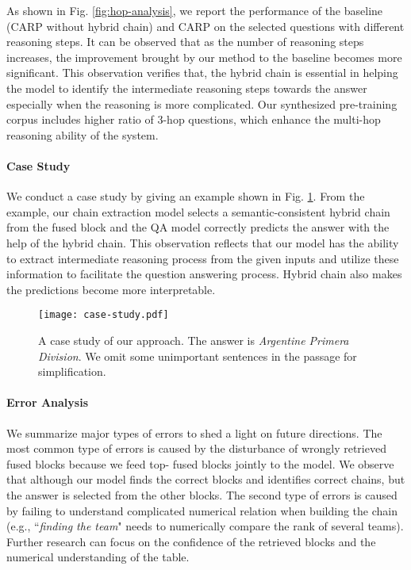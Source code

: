 \documentclass[11pt]{article}
\begin{document}
	As shown in Fig. \ref{fig:hop-analysis}, we report the performance of the baseline (CARP without hybrid chain) and CARP on the selected questions with different reasoning steps.
It can be observed that as the number of reasoning steps
increases, the improvement brought by our method to the baseline becomes more significant. 
	This observation verifies that, the hybrid chain is essential in helping the model to identify the intermediate reasoning steps towards the answer especially when the reasoning is more complicated. 
	Our synthesized pre-training corpus includes higher ratio of 3-hop questions, which enhance the multi-hop reasoning ability of the system.
	
\paragraph{Case Study} 
	We conduct a case study by giving an example shown in Fig. \ref{fig:case-study}. 
	From the example, our chain extraction model selects a semantic-consistent hybrid chain from the fused block and the QA model correctly predicts the answer with the help of the hybrid chain. 
	This observation reflects that our model has the ability to extract intermediate reasoning process from the given inputs and utilize these information to facilitate the question answering process.
	Hybrid chain also makes the predictions become more interpretable.
	
	\begin{figure}[t]
		\centering
		\texttt{[image: case-study.pdf]}
		\caption{A case study of our approach. The answer is \textit{Argentine Primera Division}. We omit some unimportant sentences in the passage for simplification.}
		\label{fig:case-study}
	\end{figure}
	\paragraph{Error Analysis}
	We summarize major types of errors to shed a light on future directions. 
	The most common type of errors is caused by the disturbance of  wrongly retrieved fused blocks because we feed top- fused blocks jointly to the model.
	We observe that although our model finds the correct blocks and identifies correct chains, but the answer is selected from the other blocks. 
	The second type of errors is caused by failing to understand complicated numerical relation when building the chain (e.g.,  ``\textit{finding the  team}" needs to numerically compare the rank of several teams). 
	Further research can focus on the confidence of the retrieved blocks and the numerical understanding of the table.
	
\end{document}
